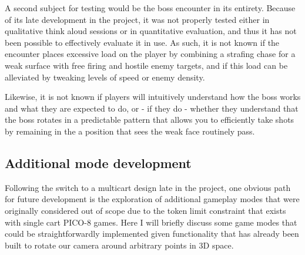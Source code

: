 \documentclass[11pt]{article}
\begin{document}
A second subject for testing would be the boss encounter in its entirety. Because of its late
development in the project, it was not properly tested either in qualitative think aloud sessions
or in quantitative evaluation, and thus it has not been possible to effectively evaluate it 
in use. As such, it is not known if the encounter places excessive load on the player by 
combining a strafing chase for a weak surface with free firing and hostile enemy targets, and
if this load can be alleviated by tweaking levels of speed or enemy density.

Likewise, it is not known if players will intuitively understand how the boss works and what
they are expected to do, or - if they do - whether they understand that the boss rotates in a 
predictable pattern that allows you to efficiently take shots by remaining in the a position
that sees the weak face routinely pass.

\subsection{Additional mode development}

Following the switch to a multicart design late in the project, one obvious path for future
development is the exploration of additional gameplay modes that were originally considered
out of scope due to the token limit constraint that exists with single cart PICO-8 games.
Here I will briefly discuss some game modes that could be straightforwardly implemented
given functionality that has already been built to rotate our camera around arbitrary
points in 3D space.
\end{document}
